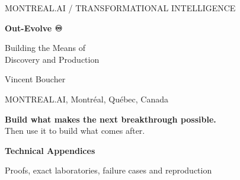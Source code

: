 \documentclass[11pt,letterpaper]{article}
\theoremstyle{definition}\newtheorem{definition}[theorem]{Definition}
\theoremstyle{remark}\newtheorem{remark}[theorem]{Remark}
\newcommand{\thesis}[1]{\begin{center}\colorbox{pale}{\begin{minipage}{.94\linewidth}\vspace{.55em}\color{ink}#1\vspace{.55em}\end{minipage}}\end{center}}
\begin{document}
\thispagestyle{empty}
\begin{center}
{\small\sffamily\color{teal} MONTREAL.AI \quad / \quad TRANSFORMATIONAL INTELLIGENCE}\par
\vspace{1.3em}
{\fontsize{43}{48}\selectfont\bfseries\color{ink} Out-Evolve {\symbolfont\color{teal}♾}}\par
\vspace{.7em}
{\Large\color{ink} Building the Means of\\Discovery and Production}\par
\vspace{1.1em}
{\large Vincent Boucher}\par
MONTREAL.AI, Montréal, Québec, Canada\par
\vspace{.4em}{\small 20 October 2026 \quad / \quad Revised research manuscript}
\end{center}
\vspace{.3em}

\vspace{.5em}
\thesis{\centering\large\textbf{Build what makes the next breakthrough possible.}\\[.3em]\normalsize Then use it to build what comes after.}
\vfill
{}
\clearpage






\clearpage
\appendix
\begin{center}
{\large\bfseries\color{ink} Technical Appendices}\par
\vspace{.3em}
{\small Proofs, exact laboratories, failure cases and reproduction}
\end{center}




\clearpage
\small
\setlength{\bibsep}{4pt}


\end{document}
